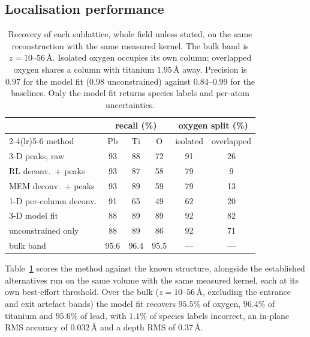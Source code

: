\documentclass[aps,prb,twocolumn,superscriptaddress,floatfix,nofootinbib]{revtex4-2}
\begin{document}
\subsection{Localisation performance}
\label{sec:bench}

\begin{table}[t]
  \centering \footnotesize
  \setlength{\tabcolsep}{4pt}
  \begin{tabular}{@{}lccccc@{}}
    \toprule
    & \multicolumn{3}{c}{recall (\%)} & \multicolumn{2}{c}{oxygen split (\%)} \\
    \cmidrule(lr){2-4}\cmidrule(lr){5-6}
    method & Pb & Ti & O & isolated & overlapped \\
    \midrule
    3-D peaks, raw                & 93 & 88 & 72 & 91 & 26 \\
    RL deconv.\ $+$ peaks        & 93 & 87 & 58 & 79 & \phantom{0}9 \\
    MEM deconv.\ $+$ peaks       & 93 & 89 & 59 & 79 & 13 \\
    1-D per-column deconv.        & 91 & 65 & 49 & 62 & 20 \\
    3-D model fit                 & 88 & 89 & 89 & 92 & 82 \\
    \quad unconstrained only      & 88 & 89 & 86 & 92 & 71 \\
    \quad bulk band            & 95.6 & 96.4 & 95.5 & --- & --- \\
    \bottomrule
  \end{tabular}
  \caption{Recovery of each sublattice, whole field unless stated, on the same reconstruction
    with the same measured kernel. The bulk band is $z=10$--$56$\,\AA. Isolated oxygen
    occupies its own column; overlapped oxygen
    shares a column with titanium $1.95$\,\AA{} away. Precision is $0.97$ for the model fit
    ($0.98$ unconstrained) against $0.84$--$0.99$ for the baselines. Only the model fit returns
    species labels and per-atom uncertainties.}
  \label{tab:detect}
\end{table}

Table~\ref{tab:detect} scores the method against the known structure, alongside the established
alternatives run on the same volume with the same measured kernel, each at its own best-effort
threshold. Over the bulk ($z=10$--$56$\,\AA, excluding the entrance and exit artefact bands) the
model fit recovers $95.5\%$ of oxygen, $96.4\%$ of titanium and $95.6\%$ of lead, with $1.1\%$
of species labels incorrect, an in-plane RMS accuracy of $0.032$\,\AA{} and a depth RMS of
$0.37$\,\AA.
\end{document}
